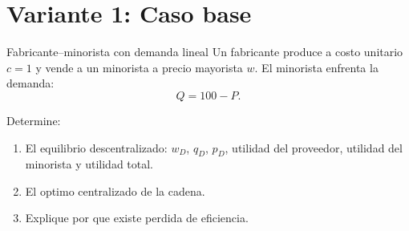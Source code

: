 \section{Variante 1: Caso base}

\begin{enunciado}{Fabricante--minorista con demanda lineal}
Un fabricante produce a costo unitario \(c=1\) y vende a un minorista a precio mayorista \(w\). El minorista enfrenta la demanda:
\[
Q=100-P.
\]

Determine:
\begin{enumerate}[label=(\alph*)]
    \item El equilibrio descentralizado: \(w_D\), \(q_D\), \(p_D\), utilidad del proveedor, utilidad del minorista y utilidad total.
    \item El optimo centralizado de la cadena.
    \item Explique por que existe perdida de eficiencia.
\end{enumerate}
\end{enunciado}
